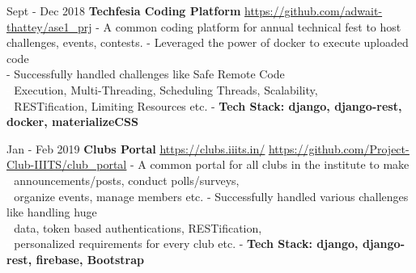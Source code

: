 \documentclass[letterpaper]{twentysecondcv} %
\begin{document}
{\begin{twenty}
	

	
	
\end{twenty}




\begin{twenty} %
	\twentyitem
	{Sept - Dec 2018 }
	{\textbf{Techfesia Coding Platform}}
	{\faExternalLinkSquare \enspace \underline{\url{ https://github.com/adwait-thattey/ase1_prj}} \vspace{3mm}}
	{ 
	 - A common coding platform for annual technical fest to host \textcolor{white}{-} challenges, events, contests. \newline
	 - Leveraged the power of docker to execute uploaded code \\
	 - Successfully handled challenges like Safe Remote Code \\
	 \textcolor{white}{-} Execution, Multi-Threading, Scheduling Threads, Scalability, \\
	 \textcolor{white}{-} RESTification, Limiting Resources etc. \newline 
	 - \textbf{Tech Stack: django, django-rest, docker, materializeCSS} \newline
	}{}
	
	
	\twentyitem
	{Jan - Feb 2019}
	{\textbf{Clubs Portal}}
	{\faExternalLinkSquare \enspace \underline{\url{https://clubs.iiits.in/}} \vspace{2mm} \newline \faExternalLinkSquare \enspace \underline{\url{ https://github.com/Project-Club-IIITS/club_portal}} \vspace{2.5mm}}
	{- A common portal for all clubs in the institute to make \\  \textcolor{white}{-} announcements/posts, conduct polls/surveys, \\\textcolor{white}{-} organize events, manage members etc. \newline
	  - Successfully handled various challenges like handling huge\\ \textcolor{white}{-} data, token based authentications, RESTification, \\ 
	  \textcolor{white}{-} personalized requirements for every club etc.
	 \newline
	 - \textbf{Tech Stack: django, django-rest, firebase, Bootstrap} \newline
	}
	

\end{twenty}}
\end{document}

